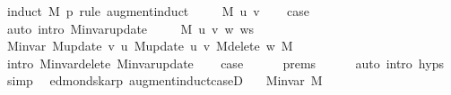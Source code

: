 \begin{isabellebody}
\ {\isacharparenleft}{\kern0pt}induct\ M\ p\ rule{\isacharcolon}{\kern0pt}\ augment{\isachardot}{\kern0pt}induct{\isacharparenright}{\kern0pt}\isanewline
\ \ \isamarkupfalse%
\ {\isacharparenleft}{\kern0pt}{}\ M\ u\ v{\isacharparenright}{\kern0pt}\isanewline
\ \ \isamarkupfalse%
\ {\isacharquery}{\kern0pt}case\isanewline
\ \ \ \ \isamarkupfalse%
\ {\isacharparenleft}{\kern0pt}auto\ intro{\isacharcolon}{\kern0pt}\ M{\isachardot}{\kern0pt}invar{\isacharunderscore}{\kern0pt}update{\isacharparenright}{\kern0pt}\isanewline
{}\isamarkupfalse%
\isanewline
\ \ \isamarkupfalse%
\ {\isacharparenleft}{\kern0pt}{}\ M\ u\ v\ w\ ws{\isacharparenright}{\kern0pt}\isanewline
\ \ \isamarkupfalse%
\ {\isachardoublequoteopen}M{\isachardot}{\kern0pt}invar\ {\isacharparenleft}{\kern0pt}M{\isacharunderscore}{\kern0pt}update\ v\ u\ {\isacharparenleft}{\kern0pt}M{\isacharunderscore}{\kern0pt}update\ u\ v\ {\isacharparenleft}{\kern0pt}M{\isacharunderscore}{\kern0pt}delete\ w\ M{\isacharparenright}{\kern0pt}{\isacharparenright}{\kern0pt}{\isacharparenright}{\kern0pt}{\isachardoublequoteclose}\isanewline
\ \ \ \ \isamarkupfalse%
\ {\isacharparenleft}{\kern0pt}intro\ M{\isachardot}{\kern0pt}invar{\isacharunderscore}{\kern0pt}delete\ M{\isachardot}{\kern0pt}invar{\isacharunderscore}{\kern0pt}update{\isacharparenright}{\kern0pt}\isanewline
\ \ \isamarkupfalse%
\ {\isacharquery}{\kern0pt}case\isanewline
\ \ \ \ \isamarkupfalse%
\ {\isachardoublequoteopen}{}{\isachardot}{\kern0pt}prems{\isachardoublequoteclose}{\isacharparenleft}{\kern0pt}{}{\isacharparenright}{\kern0pt}\isanewline
\ \ \ \ \isamarkupfalse%
\ {\isacharparenleft}{\kern0pt}auto\ intro{\isacharcolon}{\kern0pt}\ {\isachardoublequoteopen}{}{\isachardot}{\kern0pt}hyps{\isachardoublequoteclose}{\isacharparenright}{\kern0pt}\isanewline
{}\isamarkupfalse%
\ simp{\isacharplus}{\kern0pt}%
\endisatagproof
{\isafoldproof}%
%
\isadelimproof
\isanewline
%
\endisadelimproof
%
\isadeliminvisible
\isanewline
%
\endisadeliminvisible
%
\isataginvisible
{}\isamarkupfalse%
\ {\isacharparenleft}{\kern0pt}\ edmonds{\isacharunderscore}{\kern0pt}karp{\isacharparenright}{\kern0pt}\ augment{\isacharunderscore}{\kern0pt}induct{\isacharunderscore}{\kern0pt}case{\isacharunderscore}{\kern0pt}{}D{\isacharcolon}{\kern0pt}\isanewline
\ \ \ {\isachardoublequoteopen}M{\isachardot}{\kern0pt}invar\ M{\isachardoublequoteclose}\isanewline

\end{isabellebody}

